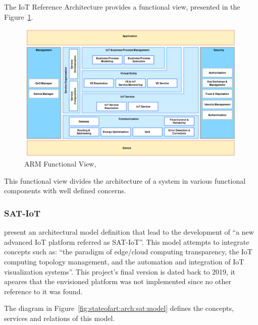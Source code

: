 The IoT Reference Architecture provides a functional view, presented in the Figure~\ref{fig:stateofart:arch:iota:functional}.

\begin{figure}[H]
    \centering
    \includegraphics[scale=0.5]{assets/figures/arm-functional-view.png}
    \caption[ARM Functional View]{ARM Functional View, \cite{iot-arm-functional}}
    \label{fig:stateofart:arch:iota:functional}
\end{figure}

This functional view divides the architecture of a system in various functional components with well defined concerns.

\subsubsection{SAT-IoT}
\label{subsubsec:stateofart:arch:sat}

\cite{8767282} present an architectural model definition that lead to the development of ``a new advanced \gls{IoT} platform referred as SAT-IoT''. This model attempts to integrate concepts such as:  ``the paradigm of edge/cloud computing transparency, the IoT computing topology management, and the automation and integration of IoT visualization systems''. This project's final version is dated back to 2019, it apeares that the envisioned platform was not implemented since no other reference to it was found.

The diagram in Figure~\ref{fig:stateofart:arch:sat:model} defines the concepts, services and relations of this model.

